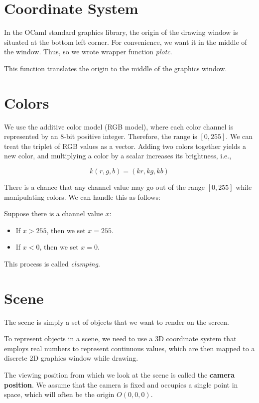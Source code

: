 \documentclass[conference]{IEEEtran}
\begin{document}
\section{Coordinate System}

In the OCaml standard graphics library, the origin of the drawing window is situated at the bottom left corner. For convenience, we want it in the middle of the window. Thus, so we wrote wrapper function \textit{plotc}.

This function translates the origin to the middle of the graphics window.

\section{Colors}

We use the additive color model (RGB model), where each color channel is represented by an 8-bit positive integer. Therefore, the range is $[0,255]$. We can treat the triplet of RGB values as a vector. Adding two colors together yields a new color, and multiplying a color by a scalar increases its brightness, i.e.,

$$k (r, g, b) = (kr, kg, kb)$$

There is a chance that any channel value may go out of the range $[0,255]$ while manipulating colors. We can handle this as follows:

Suppose there is a channel value $x$:
\begin{itemize}
    \item If $x > 255$, then we set $x = 255$.
    \item If $x < 0$, then we set $x = 0$.
\end{itemize}

This process is called \textit{clamping}.

\section{Scene}

The scene is simply a set of objects that we want to render on the screen.

To represent objects in a scene, we need to use a 3D coordinate system that employs real numbers to represent continuous values, which are then mapped to a discrete 2D graphics window while drawing.

The viewing position from which we look at the scene is called the \textbf{camera position}. We assume that the camera is fixed and occupies a single point in space, which will often be the origin $O(0,0,0)$.
\end{document}
